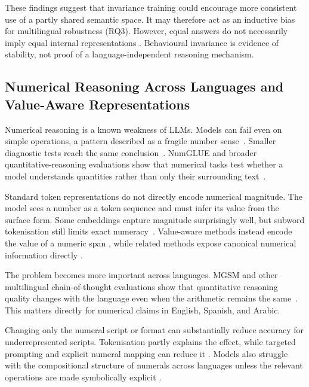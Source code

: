 These findings suggest that invariance training could encourage more consistent
use of a partly shared semantic space. It may therefore act as an inductive bias
for multilingual robustness (RQ3). However, equal answers do not necessarily
imply equal internal representations
\cite{ifergan2024beneathsurfaceconsistencyexploring}. Behavioural invariance is
evidence of stability, not proof of a language-independent reasoning mechanism.

\subsection{Numerical Reasoning Across Languages and Value-Aware Representations}
\label{subsec:numeric}

Numerical reasoning is a known weakness of LLMs. Models can fail even on simple
operations, a pattern described as a fragile number
sense~\cite{rahman2025fragilenumbersenseprobing}. Smaller diagnostic tests reach
the same conclusion~\cite{rahman2025largelanguagemodelsnumberland}. NumGLUE and
broader quantitative-reasoning evaluations show that numerical tasks test whether
a model understands quantities rather than only their surrounding
text~\cite{mishra2022numgluesuitefundamentalchallenging,lewkowycz2022solvingquantitativereasoningproblems}.

Standard token representations do not directly encode numerical magnitude. The
model sees a number as a token sequence and must infer its value from the surface
form. Some embeddings capture magnitude surprisingly well, but subword
tokenisation still limits exact numeracy~\cite{wallace2019nlpmodelsknownumbers}.
Value-aware methods instead encode the value of a numeric span
\cite{dutulescu2026valueawarenumericalrepresentationstransformer}, while related
methods expose canonical numerical information directly
\cite{schwartz2024numerologicnumberencodingenhanced}.

The problem becomes more important across languages. MGSM and other multilingual
chain-of-thought evaluations show that quantitative reasoning quality changes with
the language even when the arithmetic remains the
same~\cite{shi2022languagemodelsmultilingualchainofthought}. This matters directly
for numerical claims in English, Spanish, and Arabic.

Changing only the numeral script or format can substantially reduce accuracy for
underrepresented scripts. Tokenisation partly explains the effect, while targeted
prompting and explicit numeral mapping can reduce it
\cite{reddy2026effectscriptsformatsllm}. Models also struggle with the
compositional structure of numerals across languages unless the relevant
operations are made symbolically explicit
\cite{bhattacharya2025investigatinginteractionlinguisticmathematical}.

